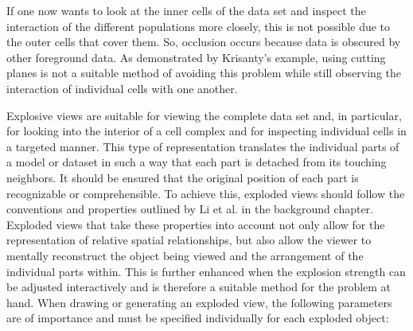 If one now wants to look at the inner cells of the data set and inspect the interaction of the different populations more closely, this is not possible due to the outer cells that cover them. 
So, occlusion occurs because data is obscured by other foreground data.
As demonstrated by Krisanty's example, using cutting planes is not a suitable method of avoiding this problem while still observing the interaction of individual cells with one another. %

Explosive views are suitable for viewing the complete data set and, in particular, for looking into the interior of a cell complex and for inspecting individual cells in a targeted manner. 
This type of representation translates the individual parts of a model or dataset in such a way that each part is detached from its touching neighbors.
It should be ensured that the original position of each part is recognizable or comprehensible. 
To achieve this, exploded views should follow the conventions and properties outlined by Li et al. in the background chapter. %
Exploded views that take these properties into account not only allow for the representation of relative spatial relationships, but also allow the viewer to mentally reconstruct the object being viewed and the arrangement of the individual parts within. 
This is further enhanced when the explosion strength can be adjusted interactively and is therefore a suitable method for the problem at hand.
When drawing or generating an exploded view, the following parameters are of importance and must be specified individually for each exploded object:
